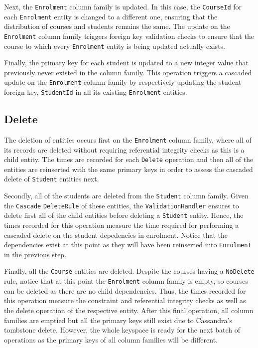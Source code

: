 Next, the \texttt{Enrolment} column family is updated. In this case, the
\texttt{CourseId} for each \texttt{Enrolment} entity is changed to a different
one, ensuring that the distribution of courses and students remains the same.
The update on the \texttt{Enrolment} column family triggers foreign key
validation checks to ensure that the course to which every \texttt{Enrolment}
entity is being updated actually exists.
					
Finally, the primary key for each student is updated to a new integer value that
previously  never existed in the column family. This operation triggers a
cascaded update on the \texttt{Enrolment} column family by respectively updating the
student foreign key, \texttt{StudentId} in all its existing \texttt{Enrolment}
entities.
		
\subsection{Delete} The deletion of entities occurs first on the
\texttt{Enrolment} column family, where all of its records are deleted without
requiring referential integrity checks as this is a child entity. The times are
recorded for each \texttt{Delete} operation and then all of the entities are
reinserted with the same primary keys in order to assess the cascaded delete of
\texttt{Student} entities next.
				
Secondly, all of the students are deleted from the \texttt{Student} column
family. Given the \texttt{Cascade} \texttt{DeleteRule} of these entities, the
\texttt{ValidationHandler} ensures to delete first all of the child entities
before deleting a \texttt{Student} entity.
Hence, the times recorded for this operation measure the time required for
performing a cascaded delete on the student depedencies in enrolment. Notice
that the dependencies exist at this point as they will have been reinserted into
\texttt{Enrolment} in the previous step.
				
Finally, all the \texttt{Course} entities are deleted. Despite the courses
having a \texttt{NoDelete} rule, notice that at this point the
\texttt{Enrolment} column family is empty, so courses can be deleted as there
are no child dependencies. Thus, the times recorded for this operation measure
the constraint and referential integrity checks as well as the delete operation
of the respective entity. After this final operation, all column families are
emptied but all the primary keys still exist due to Cassandra's tombstone
delete. However, the whole keyspace is ready for the next batch of operations as
the primary keys of all column families will be different.
	
	